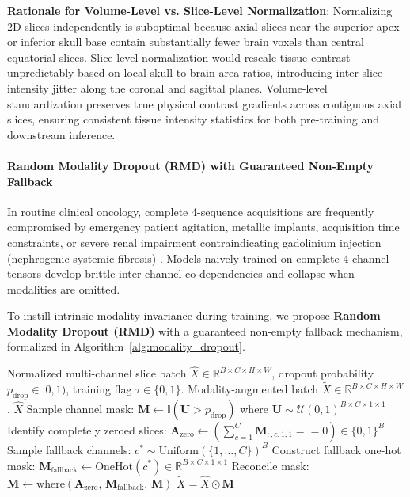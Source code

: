 \documentclass{article}
\begin{document}
\textbf{Rationale for Volume-Level vs. Slice-Level Normalization}: Normalizing 2D slices independently is suboptimal because axial slices near the superior apex or inferior skull base contain substantially fewer brain voxels than central equatorial slices. Slice-level normalization would rescale tissue contrast unpredictably based on local skull-to-brain area ratios, introducing inter-slice intensity jitter along the coronal and sagittal planes. Volume-level standardization preserves true physical contrast gradients across contiguous axial slices, ensuring consistent tissue intensity statistics for both pre-training and downstream inference.

\paragraph{Random Modality Dropout (RMD) with Guaranteed Non-Empty Fallback}
In routine clinical oncology, complete 4-sequence acquisitions are frequently compromised by emergency patient agitation, metallic implants, acquisition time constraints, or severe renal impairment contraindicating gadolinium injection (nephrogenic systemic fibrosis) \citep{havaei2017brain,dorent2019hetero}. Models naively trained on complete 4-channel tensors develop brittle inter-channel co-dependencies and collapse when modalities are omitted.

To instill intrinsic modality invariance during training, we propose \textbf{Random Modality Dropout (RMD)} with a guaranteed non-empty fallback mechanism, formalized in Algorithm~\ref{alg:modality_dropout}.

\begin{algorithm}[H]
\caption{Random Modality Dropout with Guaranteed Non-Empty Fallback}
\label{alg:modality_dropout}
\begin{algorithmic}[1]
\Require Normalized multi-channel slice batch $\hat{X} \in \mathbb{R}^{B \times C \times H \times W}$, dropout probability $p_{\text{drop}} \in [0, 1)$, training flag $\tau \in \{0, 1\}$.
\Ensure Modality-augmented batch $\tilde{X} \in \mathbb{R}^{B \times C \times H \times W}$.
    \State \Return $\hat{X}$ 
\EndIf
\State Sample channel mask: $\mathbf{M} \leftarrow \mathbb{I}\left( \mathbf{U} > p_{\text{drop}} \right)$ where $\mathbf{U} \sim \mathcal{U}(0, 1)^{B \times C \times 1 \times 1}$
\State Identify completely zeroed slices: $\mathbf{A}_{\text{zero}} \leftarrow \left( \sum_{c=1}^C \mathbf{M}_{:, c, 1, 1} == 0 \right) \in \{0, 1\}^B$
\State Sample fallback channels: $c^* \sim \text{Uniform}(\{1, \dots, C\})^B$
\State Construct fallback one-hot mask: $\mathbf{M}_{\text{fallback}} \leftarrow \text{OneHot}(c^*) \in \mathbb{R}^{B \times C \times 1 \times 1}$
\State Reconcile mask: $\mathbf{M} \leftarrow \text{where}(\mathbf{A}_{\text{zero}}, \, \mathbf{M}_{\text{fallback}}, \, \mathbf{M})$
\State \Return $\tilde{X} = \hat{X} \odot \mathbf{M}$ 
\end{algorithmic}
\end{algorithm}
\end{document}
